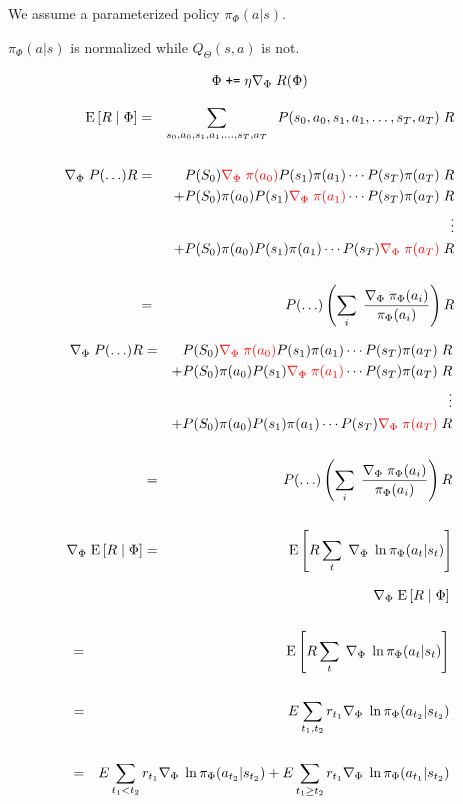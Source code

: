 {

We assume a parameterized policy $\pi_\Phi(a|s)$.

\vfill
$\pi_\Phi(a|s)$ is normalized while $Q_\Theta(s,a)$ is not.

\vfill
$$\Phi \;\mbox{\tt +=}\; \eta \nabla_\Phi \;R(\Phi)$$

\begin{eqnarray*}
  \mathrm{E}\left[R \;|\; \Phi\right] & = & \sum_{s_0,a_0,s_1,a_1,\ldots,s_T,a_T}\;\;P(s_0,a_0,s_1,a_1,\ldots,s_T,a_T)\;R \\
  \\
  \nabla_\Phi \;P(\ldots)R & = & P(S_0){\color{red} \nabla_\Phi \;\pi(a_0)}P(s_1)\pi(a_1) \cdots P(s_T)\pi(a_T)\;R \\
  & & + P(S_0)\pi(a_0)P(s_1){\color{red} \nabla_\Phi\;\pi(a_1)} \cdots P(s_T)\pi(a_T)\;R \\
  & & \vdots \\
  & & + P(S_0)\pi(a_0)P(s_1)\pi(a_1) \cdots P(s_T){\color{red} \nabla_\Phi\;\pi(a_T)}\;R \\
  \\
  & = & P(\ldots) \left(\sum_i\;\frac{\nabla_\Phi\;\pi_\Phi(a_i)}{\pi_\Phi(a_i)}\right) R
\end{eqnarray*}



\begin{eqnarray*}
  \nabla_\Phi \;P(\ldots)R & = & P(S_0){\color{red} \nabla_\Phi \;\pi(a_0)}P(s_1)\pi(a_1) \cdots P(s_T)\pi(a_T)\;R \\
  & & + P(S_0)\pi(a_0)P(s_1){\color{red} \nabla_\Phi\;\pi(a_1)} \cdots P(s_T)\pi(a_T)\;R \\
  & & \vdots \\
  & & + P(S_0)\pi(a_0)P(s_1)\pi(a_1) \cdots P(s_T){\color{red} \nabla_\Phi\;\pi(a_T)}\;R \\
  \\
  & = & P(\ldots) \left(\sum_i\;\frac{\nabla_\Phi\;\pi_\Phi(a_i)}{\pi_\Phi(a_i)}\right) R \\
  \\
  \nabla_\Phi \;\mathrm{E}\left[R \;|\; \Phi\right]& = & \mathrm{E}\left[R \sum_t\;\nabla_\Phi\;\ln \pi_\Phi(a_t|s_t)\right]
\end{eqnarray*}

\begin{eqnarray*}
 & &   \nabla_\Phi \;\mathrm{E}\left[R \;|\; \Phi\right] \\
  \\
  & = & \mathrm{E}\left[R \sum_t\;\nabla_\Phi\;\ln \pi_\Phi(a_t|s_t)\right] \\
  \\
  & = & E \sum_{t_1,t_2} r_{t_1} \nabla_\Phi\;\ln \pi_\Phi(a_{t_2}|s_{t_2}) \\
  \\
  & = & E \sum_{t_1 < t_2} r_{t_1} \nabla_\Phi\;\ln \pi_\Phi(a_{t_2}|s_{t_2})
  + E \sum_{t_1 \geq t_2} r_{t_1} \nabla_\Phi\;\ln \pi_\Phi(a_{t_1}|s_{t_2})
\end{eqnarray*}


}
